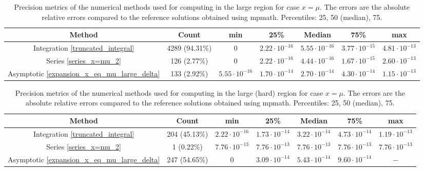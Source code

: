 \documentclass[10pt,a4paper,oneside]{article}
\numberwithin{equation}{section}
\begin{document}
\begin{table}[htbp]
\centering
\scalebox{0.9}
{
\begin{tabular}{ccccccc}
\hline
Method & Count & min & 25\% & Median & 75\% & max\\
\hline
Integration \eqref{truncated_integral} & 4289 (94.31\%) & 0 & $2.22\cdot 10^{-16}$ & $5.55\cdot 10^{-16}$ & $3.77\cdot 10^{-15}$ & $4.81\cdot 10^{-13}$\\
Series \eqref{series_x=mu_2} & 126 (2.77\%) & 0 & $2.22\cdot 10^{-16}$ & $4.44\cdot 10^{-16}$ & $1.67\cdot 10^{-15}$ & $2.60\cdot 10^{-13}$\\
Asymptotic \eqref{expansion_x_eq_mu_large_delta} & 133 (2.92\%) & $5.55\cdot 10^{-16}$ & $1.70\cdot 10^{-14}$ & $2.70\cdot 10^{-14}$ & $4.30\cdot 10^{-14}$ & $1.15\cdot 10^{-13}$\\
	\hline
\end{tabular}}
	\caption{Precision metrics of the numerical methods used for computing in the large region for case $x=\mu$. The errors are the absolute relative errors compared to the reference solutions obtained using mpmath. Percentiles: 25, 50 (median), 75.}
	\label{table_methods_case_x_eq_mu_large}
\end{table}

\begin{table}[htbp]
\centering
\scalebox{0.9}
{
\begin{tabular}{ccccccc}
\hline
Method & Count & min & 25\% & Median & 75\% & max\\
\hline
Integration \eqref{truncated_integral} & 204 (45.13\%) & $2.22\cdot 10^{-16}$ & $1.73\cdot 10^{-14}$ & $3.22\cdot 10^{-14}$ & $4.73\cdot 10^{-14}$ & $1.19\cdot 10^{-13}$\\
Series \eqref{series_x=mu_2} & 1 (0.22\%) & $7.76\cdot 10^{-13}$ & $7.76\cdot 10^{-13}$ & $7.76\cdot 10^{-13}$ & $7.76\cdot 10^{-13}$ & $7.76\cdot 10^{-13}$\\
Asymptotic \eqref{expansion_x_eq_mu_large_delta} & 247 (54.65\%) & 0 & $3.09\cdot 10^{-14}$ & $5.43\cdot 10^{-14}$ & $9.60\cdot 10^{-14}$ & $-$\\
	\hline
\end{tabular}}
	\caption{Precision metrics of the numerical methods used for computing in the large (hard) region for case $x=\mu$. The errors are the absolute relative errors compared to the reference solutions obtained using mpmath. Percentiles: 25, 50 (median), 75.}
	\label{table_methods_case_x_eq_mu_large_hard}
\end{table}
\end{document}
